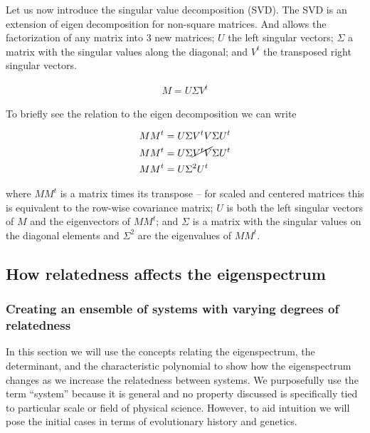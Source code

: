 \documentclass[
  letterpaper,
  DIV=11,
  numbers=noendperiod]{scrartcl}
\begin{document}
Let us now introduce the singular value decomposition (SVD). The SVD is
an extension of eigen decomposition for non-square matrices. And allows
the factorization of any matrix into 3 new matrices; \(U\) the left
singular vectors; \(\Sigma\) a matrix with the singular values along the
diagonal; and \(V^t\) the transposed right singular vectors.

\begin{align*}
M = U\Sigma V^t
\end{align*}

To briefly see the relation to the eigen decomposition we can write

\begin{align*}
MM^t &= U\Sigma V^t V \Sigma U^t \\
MM^t &= U\Sigma \cancel{V^t V} \Sigma U^t \\
MM^t &= U\Sigma^2 U^t \\
\end{align*}

where \(MM^t\) is a matrix times its transpose -- for scaled and
centered matrices this is equivalent to the row-wise covariance matrix;
\(U\) is both the left singular vectors of \(M\) and the eigenvectors of
\(MM^t\); and \(\Sigma\) is a matrix with the singular values on the
diagonal elements and \(\Sigma^2\) are the eigenvalues of \(MM^t\).

\hypertarget{how-relatedness-affects-the-eigenspectrum}{%
\subsection{How relatedness affects the
eigenspectrum}\label{how-relatedness-affects-the-eigenspectrum}}

\hypertarget{creating-an-ensemble-of-systems-with-varying-degrees-of-relatedness}{%
\subsubsection{Creating an ensemble of systems with varying degrees of
relatedness}\label{creating-an-ensemble-of-systems-with-varying-degrees-of-relatedness}}

In this section we will use the concepts relating the eigenspectrum, the
determinant, and the characteristic polynomial to show how the
eigenspectrum changes as we increase the relatedness between systems. We
purposefully use the term ``system'' because it is general and no
property discussed is specifically tied to particular scale or field of
physical science. However, to aid intuition we will pose the initial
cases in terms of evolutionary history and genetics.
\end{document}
